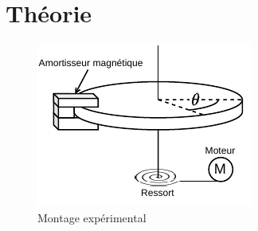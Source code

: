 \section{Théorie}

\begin{figure}
    \centering
    \includegraphics[width=\linewidth]{figures/overkill_montage.pdf}
    \caption{Montage expérimental}
    \label{fig:montage_exp}
\end{figure}

